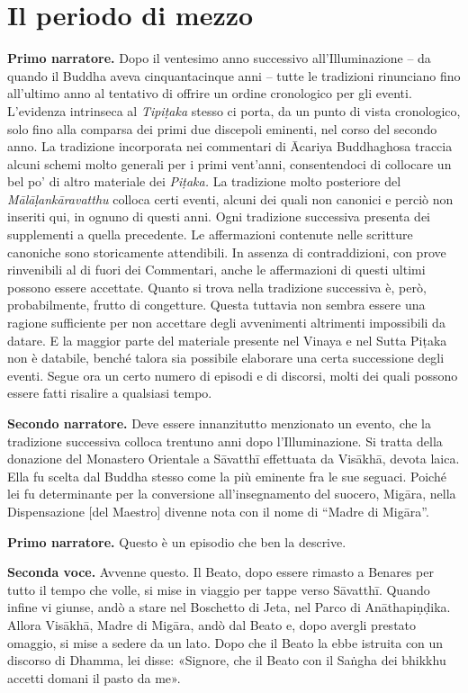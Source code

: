 \chapter{Il periodo di mezzo}

\textbf{Primo narratore.} Dopo il ventesimo anno successivo all’Illuminazione –
da quando il Buddha aveva cinquantacinque anni – tutte le tradizioni
rinunciano fino all’ultimo anno al tentativo di offrire un ordine
cronologico per gli eventi. L’evidenza intrinseca al \emph{Tipiṭaka} stesso
ci porta, da un punto di vista cronologico, solo fino alla comparsa dei
primi due discepoli eminenti, nel corso del secondo anno. La tradizione
incorporata nei commentari di Ācariya Buddhaghosa traccia alcuni schemi
molto generali per i primi vent’anni, consentendoci di collocare un bel
po’ di altro materiale dei \emph{Piṭaka.} La tradizione molto posteriore del
\emph{Mālāḷankāravatthu} colloca certi eventi, alcuni dei quali non canonici
e perciò non inseriti qui, in ognuno di questi anni. Ogni tradizione
successiva presenta dei supplementi a quella precedente. Le affermazioni
contenute nelle scritture canoniche sono storicamente attendibili. In
assenza di contraddizioni, con prove rinvenibili al di fuori dei
Commentari, anche le affermazioni di questi ultimi possono essere
accettate. Quanto si trova nella tradizione successiva è, però,
probabilmente, frutto di congetture. Questa tuttavia non sembra essere
una ragione sufficiente per non accettare degli avvenimenti altrimenti
impossibili da datare. E la maggior parte del materiale presente nel
Vinaya e nel Sutta Piṭaka non è databile, benché talora sia possibile
elaborare una certa successione degli eventi. Segue ora un certo numero
di episodi e di discorsi, molti dei quali possono essere fatti risalire
a qualsiasi tempo.


\textbf{Secondo narratore.} Deve essere innanzitutto menzionato un evento, che la
tradizione successiva colloca trentuno anni dopo l’Illuminazione. Si
tratta della donazione del Monastero Orientale a Sāvatthī effettuata da
Visākhā, devota laica. Ella fu scelta dal Buddha stesso come la più
eminente fra le sue seguaci. Poiché lei fu determinante per la
conversione all’insegnamento del suocero, Migāra, nella Dispensazione
[del Maestro] divenne nota con il nome di “Madre di Migāra”.


\textbf{Primo narratore.} Questo è un episodio che ben la descrive.


\textbf{Seconda voce.} Avvenne questo. Il Beato, dopo essere rimasto a Benares
per tutto il tempo che volle, si mise in viaggio per tappe verso
Sāvatthī. Quando infine vi giunse, andò a stare nel Boschetto di Jeta,
nel Parco di Anāthapiṇḍika. Allora Visākhā, Madre di Migāra, andò dal
Beato e, dopo avergli prestato omaggio, si mise a sedere da un lato.
Dopo che il Beato la ebbe istruita con un discorso di Dhamma, lei disse:
«Signore, che il Beato con il Saṅgha dei bhikkhu accetti domani il pasto
da me».


